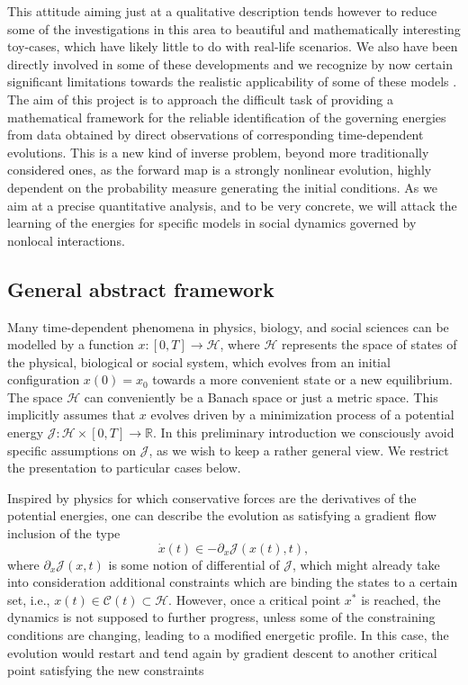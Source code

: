 \documentclass[A4paper,11pt]{article}
\theoremstyle{definition}
\begin{document}
This attitude aiming just at a qualitative description tends however to reduce  some of the investigations in this area to  beautiful and mathematically interesting toy-cases, which have likely little to do with real-life scenarios. We also have been directly involved in some of these developments  and we recognize by now certain significant limitations towards the realistic applicability of some of these models \cite{}.\\
The aim of this project is to approach the difficult task of providing a  mathematical framework for the reliable identification of the governing energies from data obtained by direct observations of corresponding time-dependent evolutions. This is a new kind of inverse problem, beyond more traditionally considered ones, as the forward map is a strongly nonlinear  evolution, highly dependent on the probability measure generating the initial conditions. As we aim at a precise quantitative analysis, and to be very concrete, we will  attack the learning of the energies for specific models in social dynamics governed by nonlocal interactions.



\subsection{General abstract framework}

Many time-dependent phenomena in physics, biology, and social sciences can be modelled by a function $x:[0,T] \to \mathcal H$, where $\mathcal H$ represents the space of states of the physical, biological or social system, which evolves from an initial configuration $x(0)=x_0$  towards a more convenient state or a new equilibrium. The space $\mathcal H$ can conveniently be a Banach space or just a metric space. 
This implicitly assumes that $x$ evolves driven by a minimization process of a potential energy $\mathcal J: \mathcal H \times [0,T] \to \mathbb R$.  In this preliminary introduction we consciously avoid specific assumptions on  $\mathcal J$, as we wish to keep a rather general view. We restrict the presentation to particular cases below.%

Inspired by physics for which conservative forces are the derivatives of the potential energies, one can describe the evolution as satisfying a gradient flow inclusion of the type
\begin{equation}\label{gradientflow}
\dot x(t) \in - \partial_x \mathcal J(x(t),t),
\end{equation}
where $\partial_x \mathcal J(x,t)$ is some notion of differential of $\mathcal J$, which might already take into consideration additional constraints which are binding the states to a certain set, i.e., $x(t) \in \mathcal C(t) \subset \mathcal H$. However, once a critical point $x^*$ is reached, the dynamics is not supposed to further progress, unless some of the constraining conditions are changing, leading to a modified energetic profile. In this case, the evolution would restart and tend again by gradient descent to another critical point satisfying the new constraints
\end{document}
